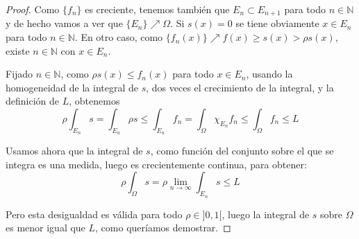 \documentclass[a4paper, 12pt]{article}
\begin{document}
\begin{enumerate}[label=\textbf{\arabic*}.]
\begin{proof}
Como \(\{f_n\}\) es creciente, tenemos también que \(E_n \subset E_{n+1}\) para todo \(n \in \mathbb{N}\) y de hecho vamos a ver que \(\{E_n\} \nearrow \Omega\). Si \(s (x) = 0\) se tiene obviamente \(x \in E_n\) para todo \(n \in \mathbb{N}\). En otro caso, como \(\{f_n (x) \} \nearrow f(x) \geq s(x) > \rho s(x)\), existe \(n \in \mathbb{N}\) con \(x \in E_n\).

Fijado \(n \in \mathbb{N}\), como \(\rho s(x) \leq f_n(x)\) para todo \(x \in E_n\), usando la homogeneidad de la integral de \(s\), dos veces el crecimiento de la integral, y la definición de \(L\), obtenemos
\[
	\rho \int_{E_n} s = \int_{E_n} \rho s \leq \int_{E_n} f_n = \int_{\Omega} \chi_{E_n} f_n \leq \int_{\Omega} f_n \leq L
\]

Usamos ahora que la integral de \(s\), como función del conjunto sobre el que se integra es una medida, luego es crecientemente continua, para obtener:
\[
\rho \int_{\Omega} s = \rho \lim_{n \to \infty} \int_{E_n} s \leq L
\]

Pero esta desigualdad es válida para todo \(\rho \in ]0,1[\), luego la integral de \(s\) sobre \(\Omega\) es menor igual que \(L\), como queríamos demostrar.
\end{proof}

\end{enumerate}
\end{document}
